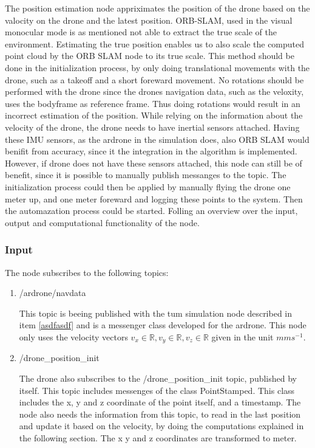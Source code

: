 	The position estimation node appriximates the position of the drone based on the valocity on the drone and the latest position. ORB-SLAM, used 
	in the visual monocular mode is as mentioned not able to extract the true scale of the environment. Estimating the true position enables us 
	to also scale the computed point cloud by the ORB SLAM node to its true scale. This method should be done in the initialization process, by 
	only doing translational movements with the drone, such as a takeoff and a short foreward movement. No rotations should be performed with the drone 
	since the drones navigation data, such as the veloxity, uses the bodyframe as reference frame. Thus doing rotations would result in an incorrect 
	estimation of the position. While relying on the information about the 
	velocity of the drone, the drone needs to have inertial sensors attached. Having these IMU sensors, as the ardrone in the simulation does, also ORB SLAM would benifit from 
	accuracy, since it the integration in the algorithm is implemented. However, if drone does not have these sensors attached, 
	this node can still be of benefit, since it is possible to manually publish messanges to the topic. The initialization process could then be applied 
	by manually flying the drone one meter up, and one meter foreward and logging these points to the system. Then the automazation process could be started.
	Folling an overview over the input, output and computational functionality of the node. 
	
	\subsubsection{Input}
	
	The node subscribes to the following topics:
	
	\begin{enumerate}
	\item{/ardrone/navdata}
	
	This topic is beeing published with the tum simulation node described in item \ref{asdfasdf} and is a messenger class developed for the ardrone.
	This node only uses the velocity vectors
	$v_x \in \mathbb{R}, v_y \in \mathbb{R}, v_z \in \mathbb{R}$ given in the unit $mms^{-1}$. 
	
	\item{/drone\_position\_init}
	
	The drone also subscribes to the /drone\_position\_init topic, published by itself. This topic includes messenges of the class PointStamped. 
	This class includes the x, y and z coordinate of the point itself, and a timestamp.  
	The node also needs the information from this topic, 
	to read in the last position and update it based on the velocity, by doing the computations explained in the following section. The x y and z 
	coordinates are transformed to meter. 
	\end{enumerate}
	
